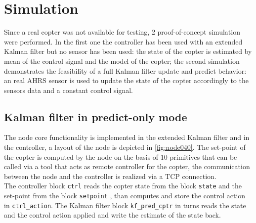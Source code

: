 \chapter{Simulation}
\label{ch:simulation} 
Since a real copter was not available for testing, 2 proof-of-concept simulation were performed. In the first one the controller has been used with an extended Kalman filter but no sensor has been used: the state of the copter is estimated by mean of the control signal and the model of the copter; the second simulation demonstrates the feasibility of a full Kalman filter update and predict behavior: an real AHRS sensor is used to update the state of the copter accordingly to the sensors data and a constant control signal.

\section{Kalman filter in predict-only mode}

The node core functionality is implemented in the extended Kalman filter and in the controller, a layout of the node is depicted in \autoref{fig:node040}. The set-point of the copter is computed by the node on the basis of 10 primitives that can be called via a tool that acts as remote controller for the copter, the communication between the node and the controller is realized via a TCP connection.\\
The controller block \texttt{ctrl} reads the copter state from the block \texttt{state} and the set-point from the block \texttt{setpoint} , than computes and store the control action in \texttt{ctrl\_action}. The Kalman filter block \texttt{kf\_pred\_cptr} in turns reads the state and the control action applied and write the estimate of the state back.

